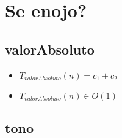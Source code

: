 \documentclass{article}
\begin{document}
    \section*{Se enojo?}

    \subsection*{valorAbsoluto}

    \begin{minipage}{0.70\textwidth}
        
    \end{minipage}
    \hfill
    \begin{minipage}{0.25\textwidth}
    \end{minipage}

    \begin{itemize}
        \item $T_{valorAbsoluto}(n) = c_1 +
                                      c_2$
        \item $T_{valorAbsoluto}(n) \in O(1)$
    \end{itemize}

    \subsection*{tono}

    \begin{minipage}{0.70\textwidth}
        
    \end{minipage}
    \hfill
    \begin{minipage}{0.25\textwidth}
    \end{minipage}
\end{document}

